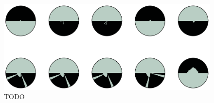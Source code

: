 \begin{figure}
\centering
\includegraphics[width=\linewidth]{figs/infuse/findings}
\caption{
TODO
}
\label{figs:infuse_findings}
\end{figure}